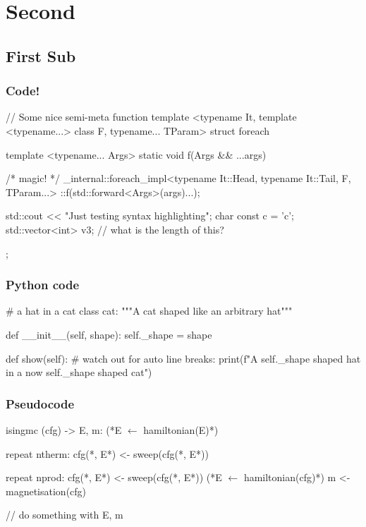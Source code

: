 \documentclass[mathserif, fleqn]{beamer}
\begin{document}
\section{Second}
\subsection{First Sub}
\begin{frame}[fragile]\frametitle{Code!}
  \begin{cppcode}[caption={A test \cpp listing}]
// Some nice semi-meta function
template <typename It,
          template <typename...> class F,
          typename... TParam>
struct foreach {
  template <typename... Args>
  static void f(Args && ...args) {
    /* magic! */
    _internal::foreach_impl<typename It::Head,
                            typename It::Tail,
                            F,
                            TParam...>
        ::f(std::forward<Args>(args)...);

    std::cout << "Just testing syntax highlighting\n";
    char const c = 'c';
    std::vector<int> v{3};  // what is the length of this?
  }
};
  \end{cppcode}
\end{frame}

\begin{frame}[fragile]\frametitle{{\dvfamily Python} code}
  \begin{pycode}[caption={Some Python as well}]
# a hat in a cat
class cat:
  """A cat shaped like an arbitrary hat"""

  def __init__(self, shape):
    self._shape = shape

  def show(self):
    # watch out for auto line breaks:
    print(f"A {self._shape} shaped hat in a now {self._shape} shaped cat")
  \end{pycode}
\end{frame}

\begin{frame}[fragile]\frametitle{Pseudocode}
  \begin{aiphipseudo}[emph={isingmc}, caption={Some MC pseudocode}]
isingmc (cfg) -> E, m:
    (*\color{aiphigreen}E $\leftarrow$ hamiltonian(E)*)

    repeat ntherm:
        cfg(*\color{aiphigreen}, E*) <- sweep(cfg(*\color{aiphigreen}, E*))

    repeat nprod:
        cfg(*\color{aiphigreen}, E*) <- sweep(cfg(*\color{aiphigreen}, E*))
        (*\color{aiphired}E $\leftarrow$ hamiltonian(cfg)*)
        m <- magnetisation(cfg)

        // do something with E, m
  \end{aiphipseudo}
\end{frame}
\end{document}
